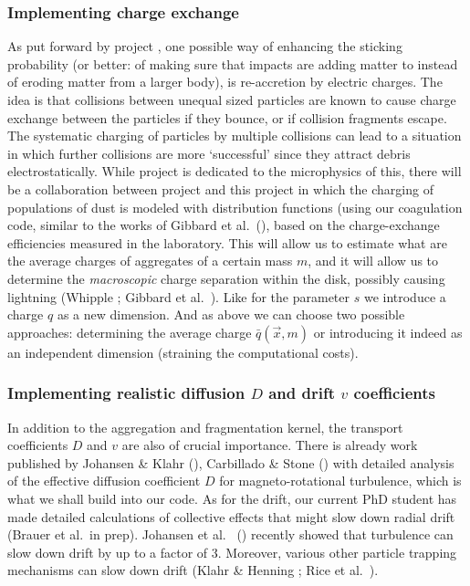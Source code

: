 \subsubsection{Implementing charge exchange}
As put forward by project \projblum{}, one possible way of enhancing the
sticking probability (or better: of making sure that impacts are adding
matter to instead of eroding matter from a larger body), is re-accretion by
electric charges. The idea is that collisions between unequal sized
particles are known to cause charge exchange between the particles if they
bounce, or if collision fragments escape. The systematic charging of
particles by multiple collisions can lead to a situation in which further
collisions are more `successful' since they attract debris electrostatically.
While project \projblum{} is dedicated to the microphysics of this, there
will be a collaboration between project \projblum{} and this project in
which the charging of populations of dust is modeled with distribution
functions (using our coagulation code, similar to the works of Gibbard et
al.~(), based on the charge-exchange efficiencies measured in the
laboratory. This will allow us to estimate what are the average charges of
aggregates of a certain mass $m$, and it will allow us to determine the {\em
macroscopic} charge separation within the disk, possibly causing lightning
(Whipple ; Gibbard et al.~). Like for the parameter $s$
we introduce a charge $q$ as a new dimension. And as above we can choose two
possible approaches: determining the average charge $\bar q(\vec x,m)$ or
introducing it indeed as an independent dimension (straining the
computational costs).


\subsubsection{Implementing realistic diffusion $D$ and drift $v$ coefficients}
In addition to the aggregation and fragmentation kernel, the transport
coefficients $D$ and $v$ are also of crucial importance. There is already
work published by Johansen \& Klahr (), Carbillado
\& Stone () with detailed analysis of the effective
diffusion coefficient $D$ for magneto-rotational turbulence, which is what we
shall build into our code. As for the drift, our current PhD student has
made detailed calculations of collective effects that might slow down radial
drift (Brauer et al.~in prep). Johansen et al.~ () recently showed
that turbulence can slow down drift by up to a factor of 3. Moreover,
various other particle trapping mechanisms can slow down drift (Klahr \&
Henning ; Rice et al.~).

